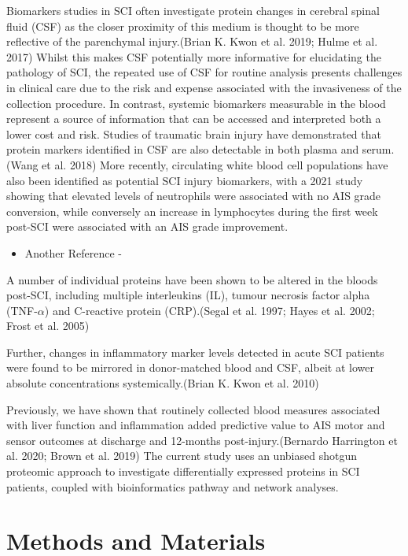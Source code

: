 \documentclass[9pt,lineno]{elife}
\providecommand{\tightlist}{%
  \setlength{\itemsep}{0pt}\setlength{\parskip}{0pt}}
\begin{document}
Biomarkers studies in SCI often investigate protein changes in cerebral spinal fluid (CSF) as the closer proximity of this medium is thought to be more reflective of the parenchymal injury.(Brian K. Kwon et al. 2019; Hulme et al. 2017)
Whilst this makes CSF potentially more informative for elucidating the pathology of SCI, the repeated use of CSF for routine analysis presents challenges in clinical care due to the risk and expense associated with the invasiveness of the collection procedure. In contrast, systemic biomarkers measurable in the blood represent a source of information that can be accessed and interpreted both a lower cost and risk. Studies of traumatic brain injury have demonstrated that protein markers identified in CSF are also detectable in both plasma and serum.(Wang et al. 2018) More recently, circulating white blood cell populations have also been identified as potential SCI injury biomarkers, with a 2021 study showing that elevated levels of neutrophils were associated with no AIS grade conversion, while conversely an increase in lymphocytes during the first week post-SCI were associated with an AIS grade improvement.

\begin{itemize}
\tightlist
\item
  Another Reference -
\end{itemize}

A number of individual proteins have been shown to be altered in the bloods post-SCI, including multiple interleukins (IL), tumour necrosis factor alpha (TNF-\(\alpha\)) and C-reactive protein (CRP).(Segal et al. 1997; Hayes et al. 2002; Frost et al. 2005)

Further, changes in inflammatory marker levels detected in acute SCI patients were found to be mirrored in donor-matched blood and CSF, albeit at lower absolute concentrations systemically.(Brian K. Kwon et al. 2010)

Previously, we have shown that routinely collected blood measures associated with liver function and inflammation added predictive value to AIS motor and sensor outcomes at discharge and 12-months post-injury.(Bernardo Harrington et al. 2020; Brown et al. 2019) The current study uses an unbiased shotgun proteomic approach to investigate differentially expressed proteins in SCI patients, coupled with bioinformatics pathway and network analyses.

\hypertarget{methods-and-materials}{%
\section{Methods and Materials}\label{methods-and-materials}}
\end{document}
